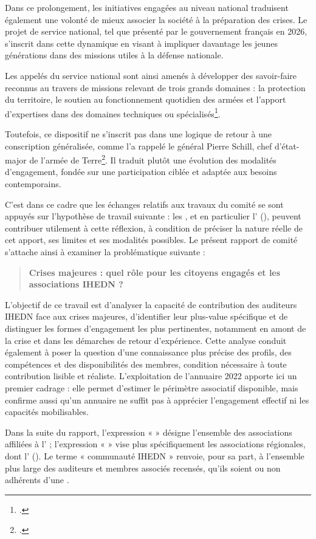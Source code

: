 Dans ce prolongement, les initiatives engagées au niveau national traduisent également une volonté de mieux associer la société à la préparation des crises. Le projet de service national, tel que présenté par le gouvernement français en 2026, s'inscrit dans cette dynamique en visant à impliquer davantage les jeunes générations dans des missions utiles à la défense nationale.

Les appelés du service national sont ainsi amenés à développer des savoir-faire reconnus au travers de missions relevant de trois grands domaines : la protection du territoire, le soutien au fonctionnement quotidien des armées et l'apport d'expertises dans des domaines techniques ou spécialisés\footcite{info_gouv_service_national}.

Toutefois, ce dispositif ne s'inscrit pas dans une logique de retour à une conscription généralisée, comme l'a rappelé le général Pierre Schill, chef d'état-major de l'armée de Terre\footcite{leparisien_schill_service_national}. Il traduit plutôt une évolution des modalités d'engagement, fondée sur une participation ciblée et adaptée aux besoins contemporains.

C'est dans ce cadre que les échanges relatifs aux travaux du comité se sont appuyés sur l'hypothèse de travail suivante : les \AssociationsUnionIHEDN, et en particulier l'\AssociationRegionaleIDF{} (\ARSeize), peuvent contribuer utilement à cette réflexion, à condition de préciser la nature réelle de cet apport, ses limites et ses modalités possibles. Le présent rapport de comité s'attache ainsi à examiner la problématique suivante :

\begin{quote}
\textbf{Crises majeures : quel rôle pour les citoyens engagés et les associations IHEDN ?}
\end{quote}

\clearpage

L'objectif de ce travail est d'analyser la capacité de contribution des auditeurs IHEDN face aux crises majeures, d'identifier leur plus-value spécifique et de distinguer les formes d'engagement les plus pertinentes, notamment en amont de la crise et dans les démarches de retour d'expérience. Cette analyse conduit également à poser la question d'une connaissance plus précise des profils, des compétences et des disponibilités des membres, condition nécessaire à toute contribution lisible et réaliste. L'exploitation de l'annuaire 2022 apporte ici un premier cadrage : elle permet d'estimer le périmètre associatif disponible, mais confirme aussi qu'un annuaire ne suffit pas à apprécier l'engagement effectif ni les capacités mobilisables.

Dans la suite du rapport, l'expression « \AssociationsUnionIHEDN{} » désigne l'ensemble des associations affiliées à l'\UnionIHEDN{} ; l'expression « \AssociationsRegionalesIHEDN{} » vise plus spécifiquement les associations régionales, dont l'\AssociationRegionaleIDF{} (\ARSeize). Le terme « communauté IHEDN » renvoie, pour sa part, à l'ensemble plus large des auditeurs et membres associés recensés, qu'ils soient ou non adhérents d'une \AssociationUnionIHEDN.